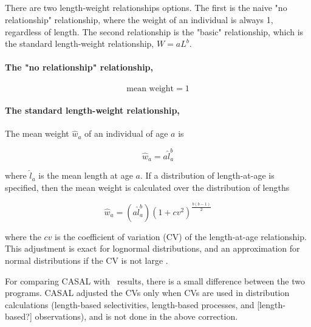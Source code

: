 \subsection{\label{sec:mean-weight}}

There are two length-weight relationships options. The first is the naive "no relationship" relationship, where the weight of an individual is always 1, regardless of length. The second relationship is the "basic" relationship, which is the standard length-weight relationship, $W = aL^b$.

\paragraph[None]{The "no relationship" relationship, }

  \begin{equation}
    \text{mean weight}=1
  \end{equation}

\paragraph[Basic]{The standard length-weight relationship, }

The mean weight $\hat{w}_a$ of an individual of age $a$ is

  \begin{equation}
    \hat{w}_a=a \hat{l}_a^b
  \end{equation}

where $\hat{l}_a$ is the mean length at age $a$. If a distribution of length-at-age is specified, then the mean weight is calculated over the distribution of lengths

  \begin{equation}
	  \hat{w}_a=(a\hat{l}_a^b)(1+cv^2)^{\frac{b(b-1)}{2}}
  \end{equation}

where the $cv$ is the coefficient of variation (CV) of the length-at-age relationship. This adjustment is exact for lognormal distributions, and an approximation for normal distributions if the CV is not large \citep{1388}.

For comparing CASAL with \CNAME\ results, there is a small difference between the two programs. CASAL adjusted the CVs  only when CVs are used in distribution calculations (length-based selectivities, length-based processes, and [length-based?] observations), and is not done in the above correction.

